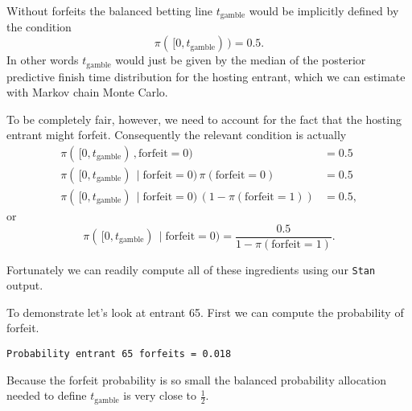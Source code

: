\documentclass[
  letterpaper,
  DIV=11,
  numbers=noendperiod]{scrartcl}
\newenvironment{Shaded}{\begin{snugshade}}{\end{snugshade}}
\newcommand{\DecValTok}[1]{\textcolor[rgb]{0.68,0.00,0.00}{#1}}
\newcommand{\FunctionTok}[1]{\textcolor[rgb]{0.28,0.35,0.67}{#1}}
\newcommand{\NormalTok}[1]{\textcolor[rgb]{0.00,0.23,0.31}{#1}}
\newcommand{\OtherTok}[1]{\textcolor[rgb]{0.00,0.23,0.31}{#1}}
\newcommand{\SpecialCharTok}[1]{\textcolor[rgb]{0.37,0.37,0.37}{#1}}
\newcommand{\StringTok}[1]{\textcolor[rgb]{0.13,0.47,0.30}{#1}}
\begin{document}
Without forfeits the balanced betting line \(t_{\mathrm{gamble}}\) would
be implicitly defined by the condition \[
\pi( \, [ 0, t_{\mathrm{gamble}} ) \, ) = 0.5.
\] In other words \(t_{\mathrm{gamble}}\) would just be given by the
median of the posterior predictive finish time distribution for the
hosting entrant, which we can estimate with Markov chain Monte Carlo.

To be completely fair, however, we need to account for the fact that the
hosting entrant might forfeit. Consequently the relevant condition is
actually \begin{align*}
\pi( \, [ 0, t_{\mathrm{gamble}} ) \, , \mathrm{forfeit} = 0 )
&=
0.5
\\
\pi( \, [ 0, t_{\mathrm{gamble}} ) \, \mid \mathrm{forfeit} = 0 ) \,
\pi( \mathrm{forfeit} = 0 )
&=
0.5
\\
\pi( \, [ 0, t_{\mathrm{gamble}} ) \, \mid \mathrm{forfeit} = 0 ) \,
\left( 1 - \pi( \mathrm{forfeit} = 1 ) \right)
&=
0.5,
\end{align*} or \[
\pi( \, [ 0, t_{\mathrm{gamble}} ) \, \mid \mathrm{forfeit} = 0 )
=
\frac{0.5}{ 1 - \pi( \mathrm{forfeit} = 1 ) }.
\]

Fortunately we can readily compute all of these ingredients using our
\texttt{Stan} output.

To demonstrate let's look at entrant 65. First we can compute the
probability of forfeit.

\begin{Shaded}
\end{Shaded}

\begin{verbatim}
Probability entrant 65 forfeits = 0.018
\end{verbatim}

Because the forfeit probability is so small the balanced probability
allocation needed to define \(t_{\mathrm{gamble}}\) is very close to
\(\frac{1}{2}\).
\end{document}
